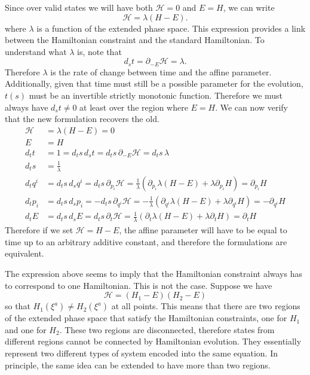 Since over valid states we will have both $\mathcal{H}=0$ and $E=H$, we can write
\begin{equation}
	\mathcal{H} = \lambda (H - E).
\end{equation}
where $\lambda$ is a function of the extended phase space. This expression provides a link between the Hamiltonian constraint and the standard Hamiltonian. To understand what $\lambda$ is, note that
\begin{equation}
	d_s t =  \partial_{-E} \mathcal{H} = \lambda.
\end{equation}
Therefore $\lambda$ is the rate of change between time and the affine parameter. Additionally, given that time must still be a possible parameter for the evolution, $t(s)$ must be an invertible strictly monotonic function. Therefore we must always have $d_s t \neq 0$ at least over the region where $E = H$. We can now verify that the new formulation recovers the old.
\begin{equation}
	\begin{aligned}
		\mathcal{H} &= \lambda(H - E) = 0 \\
		E &= H \\
		d_t t &= 1 = d_t s \, d_s t = d_t s \, \partial_{-E} \mathcal{H} = d_t s \,  \lambda \\
		d_t s &= \frac{1}{\lambda} \\ 
		d_t q^i &= d_t s \, d_s q^i = d_t s \, \partial_{p_i} \mathcal{H} = \frac{1}{\lambda} \left(\partial_{p_i} \lambda (H - E) + \lambda \partial_{p_i} H \right) = \partial_{p_i} H \\
		d_t p_i &= d_t s \, d_s p_i = - d_t s \, \partial_{q^i} \mathcal{H} = - \frac{1}{\lambda} \left(\partial_{q^i} \lambda (H - E) + \lambda \partial_{q^i} H \right) = - \partial_{q^i} H \\
		d_t E &= d_t s \, d_s E = d_t s \, \partial_{t} \mathcal{H} = \frac{1}{\lambda} \left(\partial_{t} \lambda (H - E) + \lambda \partial_{t} H \right) = \partial_t H
	\end{aligned}
\end{equation}
Therefore if we set $\mathcal{H} = H - E$, the affine parameter will have to be equal to time up to an arbitrary additive constant, and therefore the formulations are equivalent.

The expression above seems to imply that the Hamiltonian constraint always has to correspond to one Hamiltonian. This is not the case. Suppose we have
\begin{equation}
	\mathcal{H} = (H_1 - E) (H_2 - E)
\end{equation}
so that $H_1(\xi^a) \neq H_2(\xi^a)$ at all points. This means that there are two regions of the extended phase space that satisfy the Hamiltonian constraints, one for $H_1$ and one for $H_2$. These two regions are disconnected, therefore states from different regions cannot be connected by Hamiltonian evolution. They essentially represent two different types of system encoded into the same equation. In principle, the same idea can be extended to have more than two regions.


